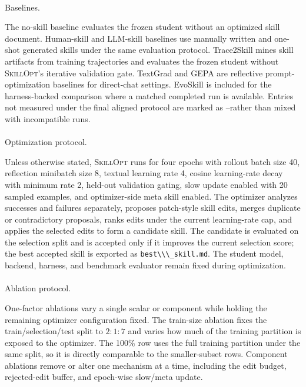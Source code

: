 \documentclass[
]{article}
\makeatletter
\let\oldparagraph\paragraph
\renewcommand{\paragraph}{
    \@ifstar
      \xxxParagraphStar
      \xxxParagraphNoStar
  }
\newcommand{\xxxParagraphStar}[1]{\oldparagraph*{#1}\mbox{}}
\newcommand{\xxxParagraphNoStar}[1]{\oldparagraph{#1}\mbox{}}
\newcommand{\passthrough}[1]{#1}
\newcommand{\ourmethod}{\textsc{SkillOpt}\xspace}
\newcommand{\na}{--}
\makeatother
\begin{document}
\paragraph{Baselines.}\label{baselines.-1}

The no-skill baseline evaluates the frozen student without an optimized
skill document. Human-skill and LLM-skill baselines use manually written
and one-shot generated skills under the same evaluation protocol.
Trace2Skill mines skill artifacts from training trajectories and
evaluates the frozen student without \ourmethod{}'s iterative validation
gate. TextGrad and GEPA are reflective prompt-optimization baselines for
direct-chat settings. EvoSkill is included for the harness-backed
comparison where a matched completed run is available. Entries not
measured under the final aligned protocol are marked as \na rather than
mixed with incompatible runs.

\paragraph{Optimization protocol.}\label{optimization-protocol.}

Unless otherwise stated, \ourmethod{} runs for four epochs with rollout
batch size 40, reflection minibatch size 8, textual learning rate 4,
cosine learning-rate decay with minimum rate 2, held-out validation
gating, slow update enabled with 20 sampled examples, and optimizer-side
meta skill enabled. The optimizer analyzes successes and failures
separately, proposes patch-style skill edits, merges duplicate or
contradictory proposals, ranks edits under the current learning-rate
cap, and applies the selected edits to form a candidate skill. The
candidate is evaluated on the selection split and is accepted only if it
improves the current selection score; the best accepted skill is
exported as \passthrough{\lstinline!best\\\_skill.md!}. The student
model, backend, harness, and benchmark evaluator remain fixed during
optimization.

\paragraph{Ablation protocol.}\label{ablation-protocol.}

One-factor ablations vary a single scalar or component while holding the
remaining optimizer configuration fixed. The train-size ablation fixes
the train/selection/test split to \(2{:}1{:}7\) and varies how much of
the training partition is exposed to the optimizer. The 100\% row uses
the full training partition under the same split, so it is directly
comparable to the smaller-subset rows. Component ablations remove or
alter one mechanism at a time, including the edit budget, rejected-edit
buffer, and epoch-wise slow/meta update.
\end{document}
